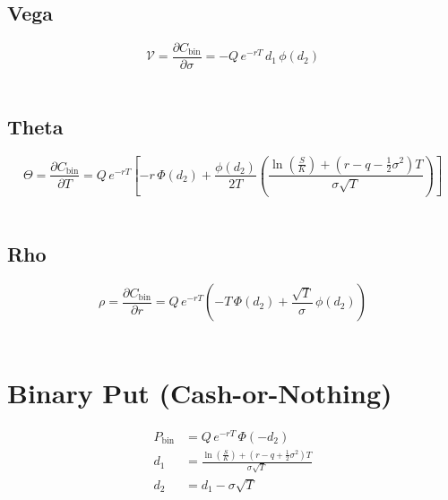\documentclass[12pt,a4paper]{article}
\begin{document}
\[
  \begin{aligned}
  \end{aligned}
\]

\subsection{Vega}
\[
  \boxed{\mathcal{V} = \frac{\partial C_{\mathrm{bin}}}{\partial \sigma} 
  = -Q\, e^{-rT}\, d_1\,\phi(d_2)}
\]

\[
  \begin{aligned}
  \end{aligned}
\]

\subsection{Theta}
\[
  \boxed{\Theta = \frac{\partial C_{\mathrm{bin}}}{\partial T}
  = Q\, e^{-rT}\!\left[
  -r\,\Phi(d_2) 
  + \frac{\phi(d_2)}{2T}
    \left(
      \frac{\ln(\tfrac{S}{K}) + (r - q - \tfrac{1}{2}\sigma^2)T}{\sigma\sqrt{T}}
    \right)
  \right]}
\]

\[
  \begin{aligned}
  \end{aligned}
\]

\subsection{Rho}
\[
  \boxed{\rho = \frac{\partial C_{\mathrm{bin}}}{\partial r}
  = Q\, e^{-rT}\!\left(
    -T\,\Phi(d_2)
    + \frac{\sqrt{T}}{\sigma}\,\phi(d_2)
  \right)}
\]

\[
  \begin{aligned}
  \end{aligned}
\]

\newpage

\section{Binary Put (Cash-or-Nothing)}

\[
  \begin{aligned}
    P_{\mathrm{bin}} & = Q \, e^{-rT} \,\Phi(-d_2) \\ 
    d_1 & = \frac{\ln\!\left(\tfrac{S}{K}\right) + (r - q + \tfrac{1}{2}\sigma^2)T}{\sigma \sqrt{T}} \\
    d_2 & = d_1 - \sigma \sqrt{T}
  \end{aligned}
\]
\end{document}
